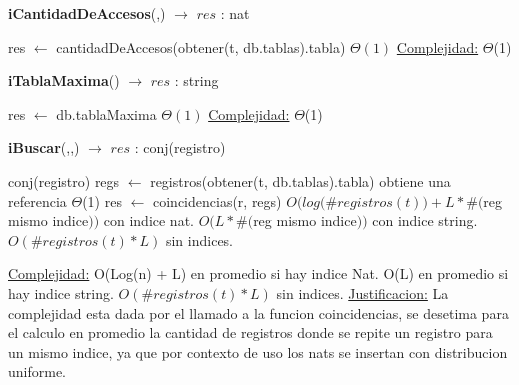 \begin{algorithm}[H]{\textbf{iCantidadDeAccesos}(,) $\to$ $res$ : nat }
    	\begin{algorithmic}[1]
    		\State res $\gets$ cantidadDeAccesos(obtener(t, db.tablas).tabla)   \Comment $\Theta(1)$
			\medskip
			\Statex \underline{Complejidad:} $\Theta$(1) 
    	\end{algorithmic}
\end{algorithm}

\begin{algorithm}[H]{\textbf{iTablaMaxima}() $\to$ $res$ : string }
    	\begin{algorithmic}[1]
    		\State res $\gets$ db.tablaMaxima  \Comment $\Theta(1)$
			\medskip
			\Statex \underline{Complejidad:} $\Theta$(1) 
    	\end{algorithmic}
\end{algorithm}


\begin{algorithm}[H]{\textbf{iBuscar}(,,) $\to$ $res$ : conj(registro) }
    	\begin{algorithmic}[1]
    		\State conj(registro) regs $\gets$ registros(obtener(t, db.tablas).tabla)  \Comment obtiene una referencia $\Theta$(1) 
    		\State res $\gets$ coincidencias(r, regs)   \Comment $O(log ($\#$registros(t)) + L * \#($reg mismo indice$))$ con indice nat. 
    		 \Statex 		\Comment  $O(L * \#($reg mismo indice$))$	con indice string. 
    		 \Statex		\Comment  $O(\#registros(t) * L)$	sin indices.

			\medskip
			\Statex \underline{Complejidad:} 
			\Statex  O(Log(n) + L) en promedio si hay indice Nat.
			\Statex  O(L) en promedio si hay indice string.
			\Statex  $O(\#registros(t) * L)$	sin indices.
			\Statex \underline{Justificacion:} La complejidad esta dada por el llamado a la funcion coincidencias, se desetima para el calculo en promedio la cantidad de registros donde se repite un registro para un mismo indice, ya que por contexto de uso los nats se insertan con distribucion uniforme.
			
    	\end{algorithmic}
\end{algorithm}
